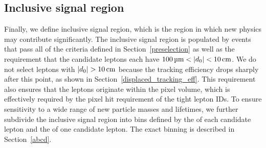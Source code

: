 \subsection{Inclusive signal region}
Finally, we define inclusive signal region, which is the region in which new physics may contribute significantly. The inclusive signal region is populated by events that pass all of the criteria defined in Section~\ref{preselection} as well as the requirement that the candidate leptons each have $\SI{100}{\um}<\ad<\SI{10}{\cm}$. We do not select leptons with $\ad>\SI{10}{\cm}$ because the tracking efficiency drops sharply after this point, as shown in Section~\ref{displaced_tracking_eff}. This requirement also ensures that the leptons originate within the pixel volume, which is effectively required by the pixel hit requirement of the tight lepton IDs. To ensure sensitivity to a wide range of new particle masses and lifetimes, we further subdivide the inclusive signal region into bins defined by the \ad of each candidate lepton and the \pt of one candidate lepton. The exact binning is described in Section~\ref{abcd}.


\pagebreak